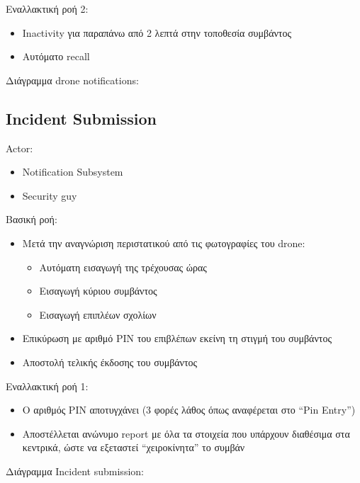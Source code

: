 \documentclass{article}
\begin{document}
\noindent Εναλλακτική ροή 2:
\begin{itemize}
    \item Inactivity για παραπάνω από 2 λεπτά στην τοποθεσία συμβάντος
    \item Αυτόματο recall
\end{itemize}

\newpage
\noindent Διάγραμμα drone notifications: \\
\noindent{}
\newpage

\subsection{Incident Submission}

\noindent Actor:
\begin{itemize}
    \item Notification Subsystem
    \item Security guy
\end{itemize}

\noindent Βασική ροή:
\begin{itemize}
    \item Μετά την αναγνώριση περιστατικού από τις φωτογραφίες του drone:
    \begin{itemize}
        \item Αυτόματη εισαγωγή της τρέχουσας ώρας
        \item Εισαγωγή κύριου συμβάντος
        \item Εισαγωγή επιπλέων σχολίων
    \end{itemize}
    \item Επικύρωση με αριθμό PIN του επιβλέπων εκείνη τη στιγμή του συμβάντος
    \item Αποστολή τελικής έκδοσης του συμβάντος
\end{itemize}

\noindent Εναλλακτική ροή 1:
\begin{itemize}
    \item Ο αριθμός PIN αποτυγχάνει (3 φορές λάθος όπως αναφέρεται στο “Pin Entry”)
    \item Αποστέλλεται ανώνυμο report με όλα τα στοιχεία που υπάρχουν διαθέσιμα στα κεντρικά, ώστε να εξεταστεί “χειροκίνητα” το συμβάν
\end{itemize}

\newpage
\noindent Διάγραμμα Incident submission: \\
\noindent{}
\newpage
\end{document}
